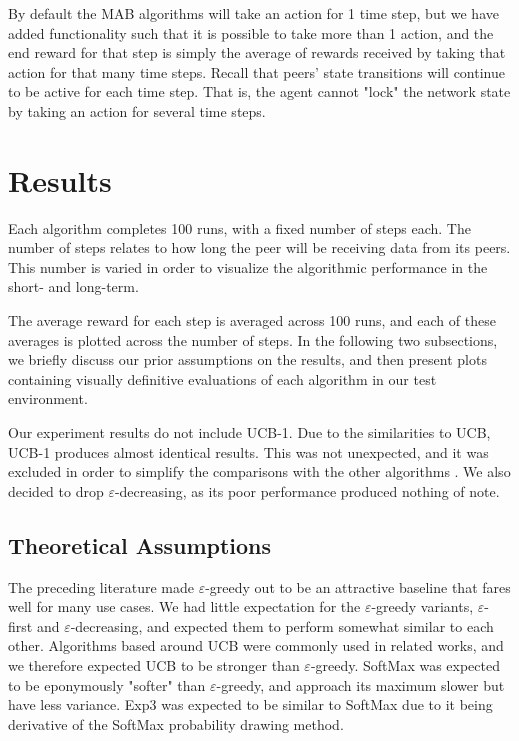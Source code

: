 \documentclass{article}
\begin{document}
By default the MAB algorithms will take an action for 1 time step, but we have added functionality such that it is possible to take more than 1 action, and the end reward 
for that step is simply the average of rewards received by taking that action for that many time steps. Recall that peers' state transitions will continue to be active 
for each time step. That is, the agent cannot "lock" the network state by taking an action for several time steps. 

\section{Results}
Each algorithm completes 100 runs, with a fixed number of steps each. The number of steps relates to how long the peer will be receiving data from its peers. This number is 
varied in order to visualize the algorithmic performance in the short- and long-term. 

The average reward for each step is averaged across 100 runs, and each of these averages is plotted across the number of steps. In the following two subsections, we briefly 
discuss our prior assumptions on the results, and then present plots containing visually definitive evaluations of each algorithm in our test environment.

Our experiment results do not include UCB-1. Due to the similarities to UCB, UCB-1 produces almost identical results. This was not unexpected, and it was excluded in order 
to simplify the comparisons with the other algorithms . We also decided to drop $\varepsilon$-decreasing, as its poor performance produced nothing of note. %

\subsection{Theoretical Assumptions} 
The preceding literature made $\varepsilon$-greedy out to be an attractive baseline that fares well for many use cases. We had little expectation for the 
$\varepsilon$-greedy variants, $\varepsilon$-first and $\varepsilon$-decreasing, and expected them to perform somewhat similar to each other. Algorithms based around UCB 
were commonly used in related works, and we therefore expected UCB to be stronger than $\varepsilon$-greedy. SoftMax was expected to be eponymously "softer" than 
$\varepsilon$-greedy, and approach its maximum slower but have less variance. Exp3 was expected to be similar to SoftMax due to it being derivative of the SoftMax 
probability drawing method.
\end{document}
